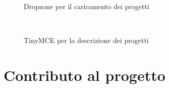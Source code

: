\documentclass{article}
\begin{document}
\begin{figure}[H]
    \begin{minipage}[c]{0.5\linewidth}
        \centering
        \\
        \caption{Dropzone per il caricamento dei progetti}
    \end{minipage}\hfill
    \begin{minipage}[c]{0.5\linewidth}
        \centering
        \\
        \caption{TinyMCE per la descrizione dei progetti}
    \end{minipage}

\end{figure}

\section{Contributo al progetto}
\end{document}
